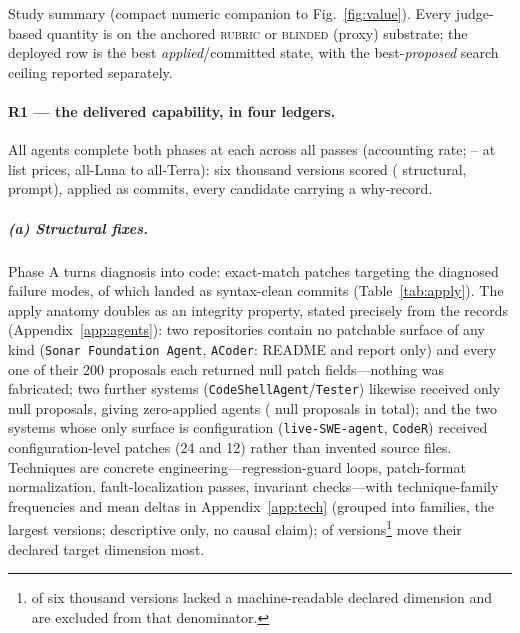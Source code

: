 \documentclass[11pt]{article}
\begin{document}
\begin{table}[t]\centering
\caption{Study summary (compact numeric companion to Fig.~\ref{fig:value}).
Every judge-based quantity is on the anchored \textsc{rubric} or \textsc{blinded}
(proxy) substrate; the deployed row is the best \emph{applied}/committed state,
with the best-\emph{proposed} search ceiling reported separately.}
\label{tab:glance}\footnotesize
\begin{adjustbox}{max width=\linewidth,center}\end{adjustbox}
\end{table}

\paragraph{R1 --- the delivered capability, in four ledgers.}
All \swN{} agents complete both phases at \swCostPerAgent{} each across all passes
(accounting rate; \swCostPerAgentListLo--\swCostPerAgentListHi{} at list prices, all-Luna to all-Terra):
six thousand versions scored (\swStructN{} structural, \swPromptN{} prompt),
\swApplied{} applied as commits, every candidate carrying a why-record.

\subparagraph{(a) Structural fixes.}
Phase A turns diagnosis into code: exact-match patches targeting the diagnosed
failure modes, \swApplied{} of which landed as syntax-clean commits
(Table~\ref{tab:apply}). The apply anatomy doubles as an integrity property, stated precisely from the
records (Appendix~\ref{app:agents}): two repositories contain no patchable
surface of any kind (\texttt{Sonar Foundation Agent}, \texttt{ACoder}: README
and report only) and every one of their 200 proposals each returned null patch
fields---nothing was fabricated; two further systems
(\texttt{CodeShellAgent}/\texttt{Tester}) likewise received only null
proposals, giving \swZeroApplied{} zero-applied agents (\swZeroPatchProps{}
null proposals in total); and the two
systems whose only surface is configuration (\texttt{live-SWE-agent},
\texttt{CodeR}) received configuration-level patches (24 and 12) rather than
invented source files. Techniques are concrete
engineering---regression-guard loops, patch-format normalization,
fault-localization passes, invariant checks---with technique-family frequencies
and mean deltas in Appendix~\ref{app:tech} (grouped into families, the largest
\swTechTopN{} versions; descriptive only, no causal claim); \swTargeting{} of \swTargetingN{} versions\footnote{\swTargetingSkip{} of six thousand versions lacked a machine-readable declared dimension and are excluded from that denominator.} move
their declared target dimension most.
\end{document}
